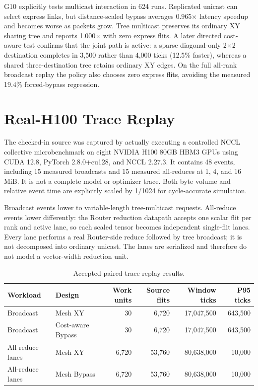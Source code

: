\documentclass[10pt]{article}
\begin{document}
G10 explicitly tests multicast interaction in 624 runs.  Replicated unicast
can select express links, but distance-scaled bypass averages 0.965$\times$
latency speedup and becomes worse as packets grow.  Tree multicast preserves
its ordinary XY sharing tree and reports 1.000$\times$ with zero express
flits.  A later directed cost-aware test confirms that the joint path is active:
a sparse diagonal-only 2$\times$2 destination completes in 3,500 rather than
4,000 ticks (12.5\% faster), whereas a shared three-destination tree retains
ordinary XY edges.  On the full all-rank broadcast replay the policy also
chooses zero express flits, avoiding the measured 19.4\% forced-bypass
regression.

\section{Real-H100 Trace Replay}

The checked-in source was captured by actually executing a controlled NCCL
collective microbenchmark on eight NVIDIA H100 80GB HBM3 GPUs using CUDA 12.8,
PyTorch 2.8.0+cu128, and NCCL 2.27.3.  It contains 48 events, including 15
measured broadcasts and 15 measured all-reduces at 1, 4, and 16 MiB.  It is
not a complete model or optimizer trace.  Both byte volume and relative event
time are explicitly scaled by 1/1024 for cycle-accurate simulation.

Broadcast events lower to variable-length tree-multicast requests.  All-reduce
events lower differently: the Router reduction datapath accepts one scalar
flit per rank and active lane, so each scaled tensor becomes independent
single-flit lanes.  Every lane performs a real Router-side reduce followed by
tree broadcast; it is not decomposed into ordinary unicast.  The lanes are
serialized and therefore do not model a vector-width reduction unit.

\begin{table}[ht]
\centering
\caption{Accepted paired trace-replay results.}
\label{tab:trace}
\begin{tabular}{llrrrr}
\toprule
Workload & Design & Work units & Source flits & Window ticks & P95 ticks \\
\midrule
Broadcast & Mesh XY & 30 & 6,720 & 17,047,500 & 643,500 \\
Broadcast & Cost-aware Bypass & 30 & 6,720 & 17,047,500 & 643,500 \\
All-reduce lanes & Mesh XY & 6,720 & 53,760 & 80,638,000 & 10,000 \\
All-reduce lanes & Mesh Bypass & 6,720 & 53,760 & 80,638,000 & 10,000 \\
\bottomrule
\end{tabular}
\end{table}
\end{document}
